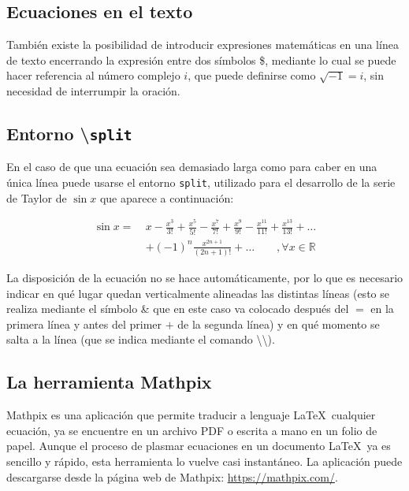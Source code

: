 \documentclass[a4paper, 11pt, spanish, twoside]{article}
\begin{document}
\subsection{Ecuaciones en el texto}

También existe la posibilidad de introducir expresiones matemáticas en una línea de texto encerrando la expresión entre dos símbolos \$, mediante lo cual se puede hacer referencia al número complejo $i$, que puede definirse como $\sqrt{-1}=i$, sin necesidad de interrumpir la oración.


\subsection{Entorno \textbackslash\texttt{split}}

En el caso de que una ecuación sea demasiado larga como para caber en una única línea puede usarse el entorno \texttt{split}, utilizado para el desarrollo de la serie de Taylor de $\sin{x}$ que aparece a continuación:

\begin{equation}
\begin{split}
    \sin{x} = \ & x - \frac{x^3}{3!} + \frac{x^5}{5!} - \frac{x^7}{7!} + \frac{x^9}{9!} - \frac{x^{11}}{11!} + \frac{x^13}{13!} + \dots \\ & + (-1)^n \frac{x^{2n+1}}{(2n+1)!} + \dots \qquad , \forall x \in \mathbb{R}
    \label{eq:taylor}
\end{split}
\end{equation}

La disposición de la ecuación no se hace automáticamente, por lo que es necesario indicar en qué lugar quedan verticalmente alineadas las distintas líneas (esto se realiza mediante el símbolo \& que en este caso va colocado después del $=$ en la primera línea y antes del primer $+$ de la segunda línea) y en qué momento se salta a la línea (que se indica mediante el comando \textbackslash\textbackslash).


\subsection{La herramienta Mathpix}

Mathpix es una aplicación que permite traducir a lenguaje \LaTeX \ cualquier ecuación, ya se encuentre en un archivo PDF o escrita a mano en un folio de papel. Aunque el proceso de plasmar ecuaciones en un documento \LaTeX \ ya es sencillo y rápido, esta herramienta lo vuelve casi instantáneo. La aplicación puede descargarse desde la página web de Mathpix: \url{https://mathpix.com/}.
\end{document}
